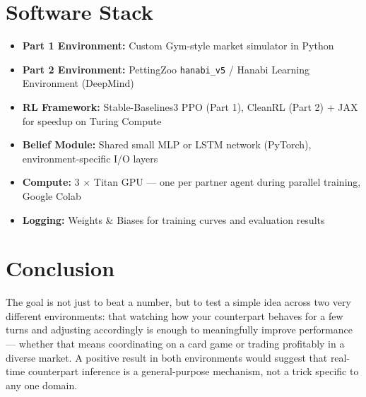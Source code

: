 \documentclass[11pt, a4paper]{article}
\begin{document}
\section{Software Stack}

\begin{itemize}[leftmargin=*]
    \item \textbf{Part 1 Environment:} Custom Gym-style market simulator in Python
    \item \textbf{Part 2 Environment:} PettingZoo \texttt{hanabi\_v5} / Hanabi Learning Environment (DeepMind)
    \item \textbf{RL Framework:} Stable-Baselines3 PPO (Part 1), CleanRL (Part 2) + JAX for speedup on Turing Compute
    \item \textbf{Belief Module:} Shared small MLP or LSTM network (PyTorch), environment-specific I/O layers
    \item \textbf{Compute:} 3 $\times$ Titan GPU --- one per partner agent during parallel training, Google Colab
    \item \textbf{Logging:} Weights \& Biases for training curves and evaluation results
\end{itemize}

\section{Conclusion}

The goal is not just to beat a number, but to test a simple idea across two very different environments: that watching how your counterpart behaves for a few turns and adjusting accordingly is enough to meaningfully improve performance --- whether that means coordinating on a card game or trading profitably in a diverse market. A positive result in both environments would suggest that real-time counterpart inference is a general-purpose mechanism, not a trick specific to any one domain.
\end{document}
